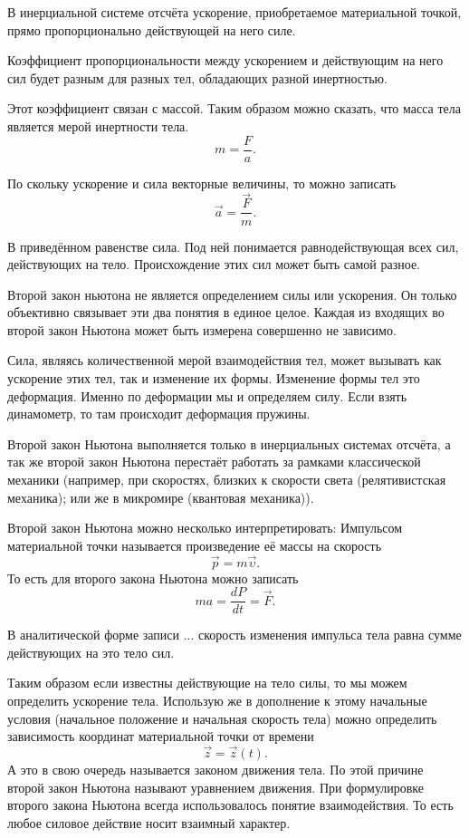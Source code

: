 \begin{theorem}\label{thrm:second-nuton}
	В инерциальной системе отсчёта ускорение, приобретаемое материальной точкой,
	прямо пропорционально действующей на него силе.
\end{theorem}

Коэффициент пропорциональности между ускорением и действующим на него сил будет
разным для разных тел, обладающих разной инертностью.

Этот коэффициент связан с массой. Таким образом можно сказать, что масса тела
является мерой инертности тела. \[
	m = \frac{F}{a}
	.\]

По скольку ускорение и сила векторные величины, то можно записать \[
	\vec{a} = \frac{\vec{F}}{m}
	.\]

В приведённом равенстве сила. Под ней понимается равнодействующая всех сил,
действующих на тело. Происхождение этих сил может быть самой разное.

\begin{corollary}
	Второй закон ньютона не является определением силы или ускорения. Он только
	объективно связывает эти два понятия в единое целое. Каждая из входящих во
	второй закон Ньютона может быть измерена совершенно не зависимо.

	Сила, являясь количественной мерой взаимодействия тел, может вызывать как
	ускорение этих тел, так и изменение их формы. Изменение формы тел это
	деформация.
	Именно по деформации мы и определяем силу. Если взять динамометр, то там
	происходит деформация пружины.
\end{corollary}

\begin{corollary}
	Второй закон Ньютона выполняется только в инерциальных системах отсчёта, а так
	же второй закон Ньютона перестаёт работать за рамками классической механики
	(например, при скоростях, близких к скорости света (релятивистская механика);
	или же в микромире (квантовая механика)).
\end{corollary}

Второй закон Ньютона можно несколько интерпретировать:
Импульсом материальной точки называется произведение её массы на скорость \[
	\vec{p} = m \vec{\upsilon}
	.\] То есть для второго закона Ньютона можно записать \[
	m a = \frac{d P}{d t} = \vec{F}
	.\]

В аналитической форме записи ... скорость изменения импульса тела равна сумме
действующих на это тело сил.

Таким образом если известны действующие на тело силы, то мы можем определить
ускорение тела. Использую же в дополнение к этому начальные условия (начальное
положение и начальная скорость тела) можно определить зависимость координат
материальной точки от времени \[
	\vec{z} = \vec{z}(t)
	.\] А это в свою очередь называется законом движения тела. По этой причине
второй закон Ньютона называют уравнением движения. При формулировке второго
закона Ньютона всегда использовалось понятие взаимодействия. То есть любое
силовое действие носит взаимный характер.

